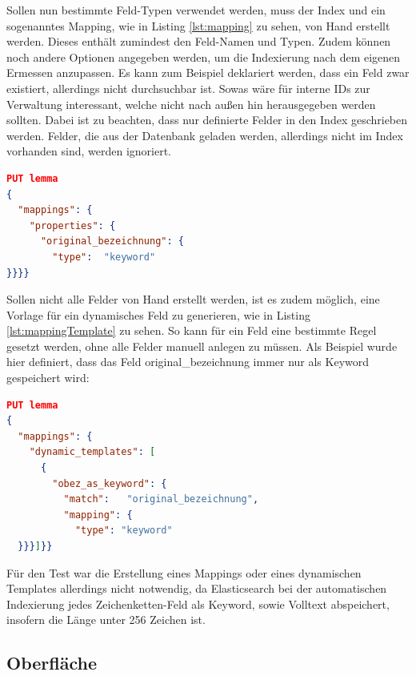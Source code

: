 Sollen nun bestimmte Feld-Typen verwendet werden, muss der Index und ein sogenanntes Mapping, wie in Listing \ref{lst:mapping} zu sehen, von Hand erstellt werden. Dieses enthält zumindest den Feld-Namen und Typen. Zudem können noch andere Optionen angegeben werden, um die Indexierung nach dem eigenen Ermessen anzupassen. Es kann zum Beispiel deklariert werden, dass ein Feld zwar existiert, allerdings nicht durchsuchbar ist. Sowas wäre für interne IDs zur Verwaltung interessant, welche nicht nach außen hin herausgegeben werden sollten. Dabei ist zu beachten, dass nur definierte Felder in den Index geschrieben werden. Felder, die aus der Datenbank geladen werden, allerdings nicht im Index vorhanden sind, werden ignoriert.

\begin{lstlisting}[language=JSON, frame=single, label={lst:mapping}, caption=Mapping für Elasticsearch Index,captionpos=b] 
PUT lemma
{
  "mappings": {
    "properties": {
      "original_bezeichnung": {
        "type":  "keyword"
}}}}
\end{lstlisting}

Sollen nicht alle Felder von Hand erstellt werden, ist es zudem möglich, eine Vorlage für ein dynamisches Feld zu generieren, wie in Listing \ref{lst:mappingTemplate} zu sehen. So kann für ein Feld eine bestimmte Regel gesetzt werden, ohne alle Felder manuell anlegen zu müssen. Als Beispiel wurde hier definiert, dass das Feld original\_bezeichnung immer nur als Keyword gespeichert wird:

\begin{lstlisting}[language=JSON, frame=single, label={lst:mappingTemplate}, caption=Dynamic-Mapping für Elasticsearch Index,captionpos=b] 
PUT lemma
{
  "mappings": {
    "dynamic_templates": [
      {
        "obez_as_keyword": {
          "match":   "original_bezeichnung",
          "mapping": {
            "type": "keyword"
  }}}]}}
\end{lstlisting}

Für den Test war die Erstellung eines Mappings oder eines dynamischen Templates allerdings nicht notwendig, da Elasticsearch bei der automatischen Indexierung jedes Zeichenketten-Feld als Keyword, sowie Volltext abspeichert, insofern die Länge unter 256 Zeichen ist. \cite{ElasticsearchB.V..13.2.2020}

\subsection{Oberfläche}

